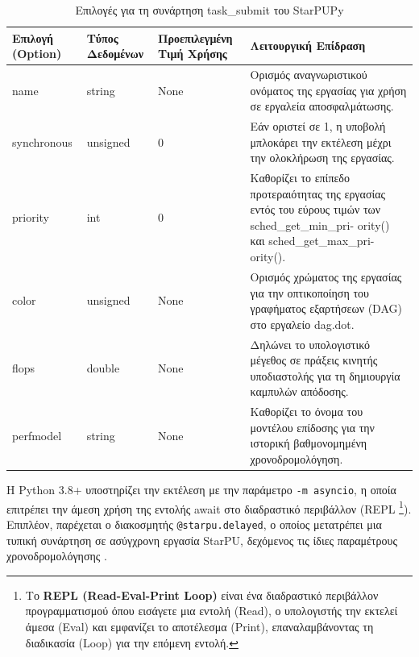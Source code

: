 \begin{table}[H]
    \centering
    \begin{tabularx}{\textwidth}{|p{2.2cm}|p{2.2cm}|p{2.2cm}|X|}
        \hline
        \textbf{Επιλογή (Option) } & 
        \textbf{Τύπος Δεδομένων } & 
        \textbf{Προεπιλεγμένη Τιμή Χρήσης} & 
        \textbf{Λειτουργική Επίδραση }\\
        \hline
        name &
        string &
        None &
        Ορισμός αναγνωριστικού ονόματος της εργασίας για χρήση σε εργαλεία αποσφαλμάτωσης.\\
        \hline
        synchronous & 
        unsigned & 
        0 & 
        Εάν οριστεί σε 1, η υποβολή μπλοκάρει την εκτέλεση μέχρι την ολοκλήρωση της εργασίας.\\
        \hline
        priority & 
        int & 
        0 &
        Καθορίζει το επίπεδο προτεραιότητας της εργασίας εντός του εύρους τιμών των sched\_get\_min\_pri- \linebreak ority() και sched\_get\_max\_pri- \linebreak ority().\\
        \hline
        color & 
        unsigned & 
        None &
        Ορισμός χρώματος της εργασίας για την οπτικοποίηση του γραφήματος εξαρτήσεων (DAG) στο εργαλείο dag.dot.\\
        \hline
        flops & 
        double & 
        None &
        Δηλώνει το υπολογιστικό μέγεθος σε πράξεις κινητής υποδιαστολής για τη δημιουργία καμπυλών απόδοσης.\\
        \hline
        perfmodel & 
        string & 
        None &
        Καθορίζει το όνομα του μοντέλου επίδοσης για την ιστορική βαθμονομημένη χρονοδρομολόγηση.\\
        \hline
    \end{tabularx}
    \caption{Επιλογές για τη συνάρτηση task\_submit του StarPUPy}
    \label{tab:starpu_task_submit}
\end{table}

Η Python 3.8+ υποστηρίζει την εκτέλεση με την παράμετρο \texttt{-m asyncio}, η οποία επιτρέπει την άμεση χρήση της εντολής await στο διαδραστικό περιβάλλον (REPL \footnote{Το \textbf{REPL (Read-Eval-Print Loop)} είναι ένα διαδραστικό περιβάλλον προγραμματισμού όπου εισάγετε μια εντολή (Read), ο υπολογιστής την εκτελεί άμεσα (Eval) και εμφανίζει το αποτέλεσμα (Print), επαναλαμβάνοντας τη διαδικασία (Loop) για την επόμενη εντολή.}). Επιπλέον, παρέχεται ο διακοσμητής \texttt{@starpu.delayed}, ο οποίος μετατρέπει μια τυπική συνάρτηση σε ασύγχρονη εργασία StarPU, δεχόμενος τις ίδιες παραμέτρους χρονοδρομολόγησης \cite{starpu2025handbook}. 

